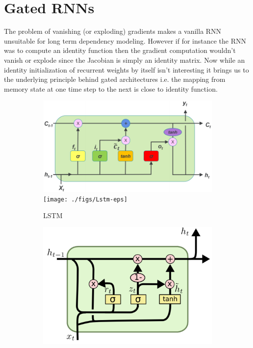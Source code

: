 \section{Gated RNNs}
The problem of vanishing (or exploding) gradients makes a vanilla RNN unsuitable for long term dependency modeling. However if for instance the RNN was to compute an identity function then the gradient computation wouldn't vanish or explode since the Jacobian is simply an identity matrix. Now while an identity initialization of recurrent weights by itself isn't  interesting it brings us to the underlying principle behind gated architectures i.e. the mapping from memory state at one time step to the next is close to identity function.

\begin{figure}[ht] 
	\begin{subfigure}[b]{0.5\linewidth}
		\centering
		\ifpdf
		\includegraphics[width=0.95\linewidth]{./figs/Lstm-pdf}
		\else
		\texttt{[image: ./figs/Lstm-eps]}
		\fi
		\caption{LSTM\citep{Zheng2017}}
		\label{lstm} 
		\vspace{4ex}
	\end{subfigure}%
	\begin{subfigure}[b]{0.5\linewidth}
		\centering
		\ifpdf
		\includegraphics[width=0.95\linewidth]{./figs/Gru-pdf}

\end{subfigure}
\end{figure}
